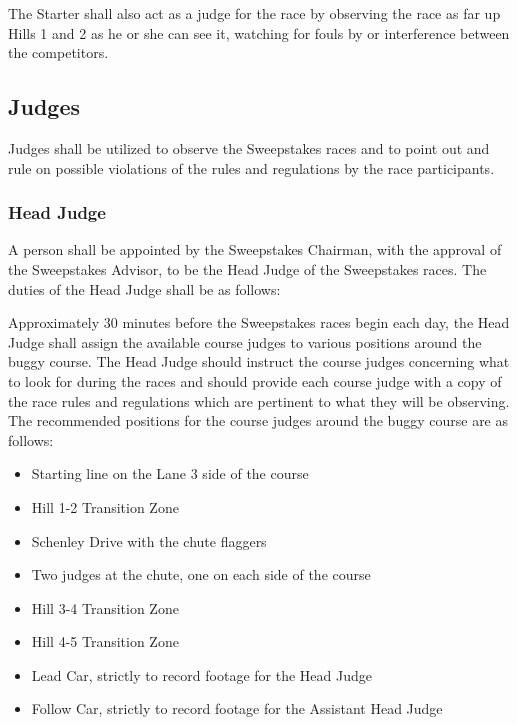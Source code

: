 	The Starter shall also act as a judge for the race by observing the race as far
	up Hills 1 and 2 as he or she can see it, watching for fouls by or interference
	between the competitors.

\subsection{Judges}

	Judges shall be utilized to observe the Sweepstakes races and to point out and
	rule on possible violations of the rules and regulations by the race
	participants. 

\subsubsection{Head Judge}

	A person shall be appointed by the Sweepstakes Chairman, with the approval of
	the Sweepstakes Advisor, to be the Head Judge of the Sweepstakes races. The
	duties of the Head Judge shall be as follows:
	
	Approximately 30 minutes before the Sweepstakes races begin each day, the Head
	Judge shall assign the available course judges to various positions around the
	buggy course. The Head Judge should instruct the course judges concerning what
	to look for during the races and should provide each course judge with a copy
	of the race rules and regulations which are pertinent to what they will be
	observing. The recommended positions for the course judges around the buggy
	course are as follows:

	\begin{itemize}

		\item Starting line on the Lane 3 side of the course

		\item Hill 1-2 Transition Zone

		\item Schenley Drive with the chute flaggers

		\item Two judges at the chute, one on each side of the course

		\item Hill 3-4 Transition Zone

		\item Hill 4-5 Transition Zone
		
		\item Lead Car, strictly to record footage for the Head Judge
		
		\item Follow Car, strictly to record footage for the Assistant Head Judge

	\end{itemize}
	

